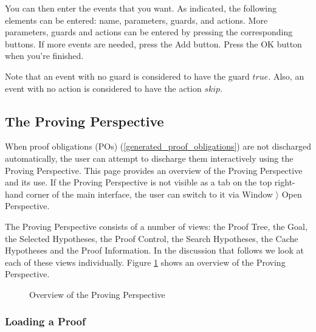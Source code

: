 You can then enter the events that you want. As indicated, the following elements can be entered: name, parameters, guards, and actions. More parameters, guards and actions can be entered by pressing the corresponding buttons. If more events are needed, press the \textsf{Add} button. Press the \textsf{OK} button when you're finished.

Note that an event with no guard is considered to have the guard $true$. Also, an event with no action is considered to have the action $skip$. 

\subsection{The Proving Perspective}
\label{proving_perspective}

When proof obligations (POs) (\ref{generated_proof_obligations}) are not discharged automatically, the user can attempt to discharge them interactively using the Proving Perspective. This page provides an overview of the Proving Perspective and its use. If the Proving Perspective is not visible as a tab on the top right-hand corner of the main interface, the user can switch to it via \textsf{Window $\rangle$ Open Perspective}.

The Proving Perspective consists of a number of views: the \textsf{Proof Tree}, the \textsf{Goal}, the \textsf{Selected Hypotheses}, the \textsf{Proof Control}, the \textsf{Search Hypotheses}, the \textsf{Cache Hypotheses} and the \textsf{Proof Information}. In the discussion that follows we look at each of these views individually. Figure \ref{fig_ref_01_proving_perspective1} shows an overview of the Proving Perspective.

\ifinprint
\begin{figure}
  \begin{center}
    \caption{Overview of the Proving Perspective}
    \label{fig_ref_01_proving_perspective1}
  \end{center}
\end{figure}
\else
{}
\fi

\subsubsection{Loading a Proof}

